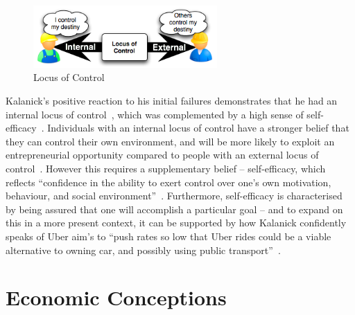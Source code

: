     \begin{figure}
      \centering
      \begin{minipage}{7cm}
        \centering
        \includegraphics[width=7cm]{inc/locus_of_control.png}
        \caption[Locus of Control ]{Locus of Control~\parencite{shead2007}}
        \label{fig:locus_of_control}
      \end{minipage}
    \end{figure}

    Kalanick's positive reaction to his initial failures demonstrates that he had an internal locus of control~\parencite{rotter1966}, which was complemented by a high sense of self-efficacy~\parencite{bandura1994}. Individuals with an internal locus of control have a stronger belief that they can control their own environment, and will be more likely to exploit an entrepreneurial opportunity compared to people with an external locus of control~\parencite{engler2009}. However this requires a supplementary belief -- self-efficacy, which reflects ``confidence in the ability to exert control over one's own motivation, behaviour, and social environment''~\parencite{carey2015}. Furthermore, self-efficacy is characterised by being assured that one will accomplish a particular goal -- and to expand on this in a more present context, it can be supported by how Kalanick confidently speaks of Uber aim's to ``push rates so low that Uber rides could be a viable alternative to owning car, and possibly using public transport''~\parencite{mishkin2015}.

  \section{Economic Conceptions}
